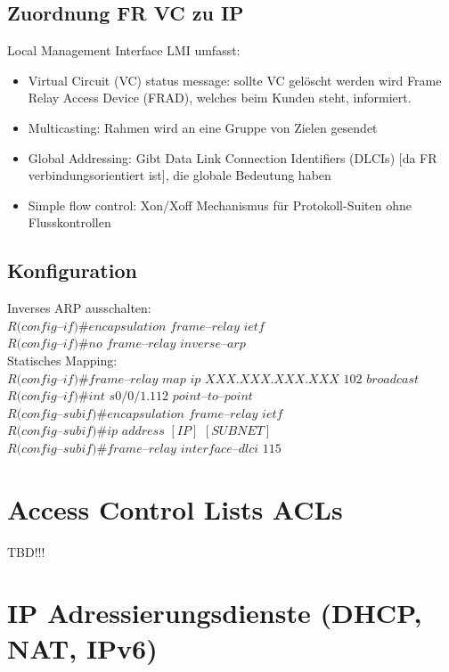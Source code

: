 \documentclass[landscape,twocolumn,a4paper]{article}
\begin{document}
\begin{footnotesize}
\subsection{Zuordnung FR VC zu IP}
Local Management Interface LMI umfasst:
\vspace{-3mm}
\begin{itemize}
	\item Virtual Circuit (VC) status message: sollte VC gelöscht werden wird Frame Relay Access Device (FRAD), welches beim Kunden steht, informiert.
	\item Multicasting: Rahmen wird an eine Gruppe von Zielen gesendet
	\item Global Addressing: Gibt Data Link Connection Identifiers (DLCIs) [da FR verbindungsorientiert ist], die globale Bedeutung haben
	\item Simple flow control: Xon/Xoff Mechanismus für Protokoll-Suiten ohne Flusskontrollen
\end{itemize}

\subsection{Konfiguration}
Inverses ARP ausschalten:\\
$R(config$--$if)\#encapsulation$ $frame$--$relay$ $ietf$\\
$R(config$--$if)\#no$ $frame$--$relay$ $inverse$--$arp$\\
Statisches Mapping:\\
$R(config$--$if)\#frame$--$relay$ $map$ $ip$ $XXX.XXX.XXX.XXX$ $102$ $broadcast$\\
$R(config$--$if)\#int$ $s0/0/1.112$ $point$--$to$--$point$\\
$R(config$--$subif)\#encapsulation$ $frame$--$relay$ $ietf$\\
$R(config$--$subif)\#ip$ $address$ $[IP]$ $[SUBNET]$\\
$R(config$--$subif)\#frame$--$relay$ $interface$--$dlci$ $115$

\newpage

\section{Access Control Lists ACLs}
TBD!!!

\newpage

\section{IP Adressierungsdienste (DHCP, NAT, IPv6)}

\end{footnotesize}
\end{document}
